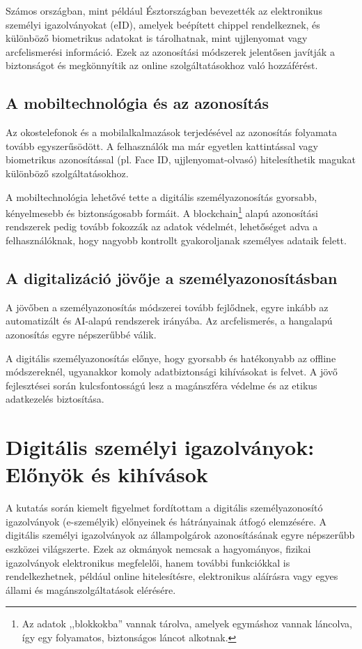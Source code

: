 \documentclass[
]{thesis-ekf}
\theoremstyle{definition}
\theoremstyle{remark}
\begin{document}
	Számos országban, mint például Észtországban bevezették az elektronikus személyi igazolványokat (eID), amelyek beépített chippel rendelkeznek, és különböző biometrikus adatokat is tárolhatnak, mint ujjlenyomat vagy arcfelismerési információ. Ezek az azonosítási módszerek jelentősen javítják a biztonságot és megkönnyítik az online szolgáltatásokhoz való hozzáférést. \cite{magyarAzonositas}
	
	\section{A mobiltechnológia és az azonosítás}
	Az okostelefonok és a mobilalkalmazások terjedésével az azonosítás folyamata tovább egyszerűsödött. A felhasználók ma már egyetlen kattintással vagy biometrikus azonosítással (pl. Face ID, ujjlenyomat-olvasó) hitelesíthetik magukat különböző szolgáltatásokhoz.
	
	A mobiltechnológia lehetővé tette a digitális személyazonosítás gyorsabb, kényelmesebb és biztonságosabb formáit. A blockchain\footnote{Az adatok ,,blokkokba'' vannak tárolva, amelyek egymáshoz vannak láncolva, így egy folyamatos, biztonságos láncot alkotnak.} alapú azonosítási rendszerek pedig tovább fokozzák az adatok védelmét, lehetőséget adva a felhasználóknak, hogy nagyobb kontrollt gyakoroljanak személyes adataik felett.
	
	\section{A digitalizáció jövője a személyazonosításban}
	A jövőben a személyazonosítás módszerei tovább fejlődnek, egyre inkább az automatizált és AI-alapú rendszerek irányába. Az arcfelismerés, a hangalapú azonosítás egyre népszerűbbé válik.
	
	A digitális személyazonosítás előnye, hogy gyorsabb és hatékonyabb az offline módszereknél, ugyanakkor komoly adatbiztonsági kihívásokat is felvet. A jövő fejlesztései során kulcsfontosságú lesz a magánszféra védelme és az etikus adatkezelés biztosítása.
	
	\chapter{Digitális személyi igazolványok: Előnyök és kihívások}
	A kutatás során kiemelt figyelmet fordítottam a digitális személyazonosító igazolványok (e-személyik) előnyeinek és hátrányainak átfogó elemzésére. A digitális személyi igazolványok az állampolgárok azonosításának egyre népszerűbb eszközei világszerte. Ezek az okmányok nemcsak a hagyományos, fizikai igazolványok elektronikus megfelelői, hanem további funkciókkal is rendelkezhetnek, például online hitelesítésre, elektronikus aláírásra vagy egyes állami és magánszolgáltatások elérésére.
	
\end{document}
